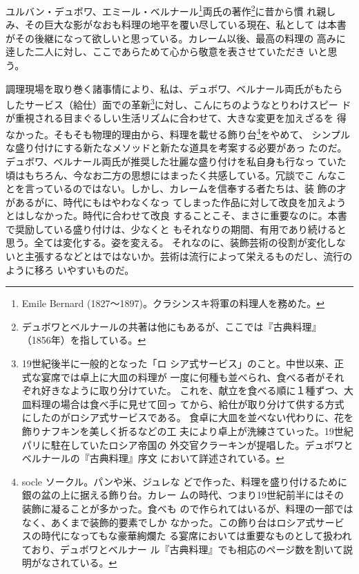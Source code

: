 ユルバン・デュボワ、エミール・ベルナール\footnote{Emile Bernard
  (1827〜1897)。クラシンスキ将軍の料理人を務めた。}両氏の著作\footnote{デュボワとベルナールの共著は他にもあるが、ここでは『古典料理』
  （1856年）を指している。}に昔から慣
れ親しみ、その巨大な影がなおも料理の地平を覆い尽している現在、私として
は本書がその後継になって欲しいと思っている。カレーム以後、最高の料理の
高みに逹した二人に対し、ここであらためて心から敬意を表させていただき
いと思う。

調理現場を取り巻く諸事情により、私は、デュボワ、ベルナール両氏がもたら
したサービス（給仕）面での革新\footnote{\protect\hypertarget{service-russe}{19世紀後半に一般的となった「ロ
  シア式サービス」のこと。中世以来、正式な宴席では卓上に大皿の料理が
  一度に何種も並べられ、食べる者がそれぞれ好きなように取り分けていた。
  これを、献立を食べる順に１種ずつ、大皿料理の場合は食べ手に見せて回っ
  てから、給仕が取り分けて供する方式にしたのがロシア式サービスである。
  食卓に大皿を並べない代わりに、花を飾りナフキンを美しく折るなどの工
  夫により卓上が洗練さていった。19世紀パリに駐在していたロシア帝国の
  外交官クラーキンが提唱した。デュボワとベルナールの『古典料理』序文
  において詳述されている。}}に対し、こんにちのようなとりわけスピー
ドが重視される目まぐるしい生活リズムに合わせて、大きな変更を加えざるを
得なかった。そもそも物理的理由から、料理を載せる飾り台\footnote{\protect\hypertarget{socle}{socle ソークル。パンや米、ジュレな
  どで作った、料理を盛り付けるために銀の盆の上に据える飾り台。カレー
  ムの時代、つまり19世紀前半にはその装飾に凝ることが多かった。食べも
  ので作られてはいるが、料理の一部ではなく、あくまで装飾的要素でしか
  なかった。この飾り台はロシア式サービスの時代になってもな豪華絢爛た
  る宴席においては重要なものとして扱われており、デュボワとベ}ルナー
  ル『古典料理』でも相応のページ数を割いて説明がなされている。}をやめて、
シンプルな盛り付けにする新たなメソッドと新たな道具を考案する必要があっ
たのだ。デュボワ、ベルナール両氏が推奨した壮麗な盛り付けを私自身も行なっ
ていた頃はもちろん、今なお二方の思想にはまったく共感している。冗談でこ
んなことを言っているのではない。しかし、カレームを信奉する者たちは、装
飾の才があるがに、時代にもはやわなくなっ
てしまった作品に対して改良を加えようとはしなかった。時代に合わせて改良
することこそ、まさに重要なのに。本書で奨励している盛り付けは、少なくと
もそれなりの期間、有用であり続けると思う。全ては変化する。姿を変える。
それなのに、装飾芸術の役割が変化しないと主張するなどとはではないか。芸術は流行によって栄えるものだし、流行のように移ろ
いやすいものだ。

